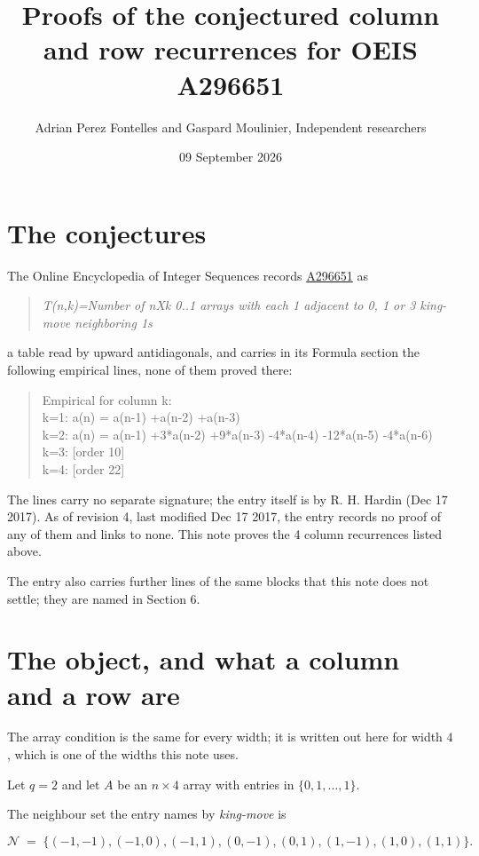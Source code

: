 \documentclass[11pt]{article}
\title{Proofs of the conjectured column and row recurrences for OEIS A296651}
\author{Adrian Perez Fontelles and Gaspard Moulinier, Independent researchers}
\date{09 September 2026}
\theoremstyle{definition}
\begin{document}
\maketitle
\section{The conjectures}

The Online Encyclopedia of Integer Sequences records \href{https://oeis.org/A296651}{A296651} as

\begin{quote}\itshape T(n,k)=Number of nXk 0..1 arrays with each 1 adjacent to 0, 1 or 3 king-move neighboring 1s\end{quote}

a table read by upward antidiagonals, and carries in its Formula section the following empirical lines, none of them proved there:

\begin{quote}\ttfamily Empirical for column k:\\
k=1: a(n) = a(n-1) +a(n-2) +a(n-3)\\k=2: a(n) = a(n-1) +3*a(n-2) +9*a(n-3) -4*a(n-4) -12*a(n-5) -4*a(n-6)\\k=3: [order 10]\\k=4: [order 22]\end{quote}

The lines carry no separate signature; the entry itself is by R. H. Hardin (Dec 17 2017). As of revision 4, last modified Dec 17 2017, the entry records no proof of any of them and links to none. This note proves the 4 column recurrences listed above.

The entry also carries further lines of the same blocks that this note does not settle; they are named in Section 6.

\section{The object, and what a column and a row are}

The array condition is the same for every width; it is written out here for width $4$, which is one of the widths this note uses.

Let $q = 2$ and let $A$ be an $n \times 4$ array with entries in $\{0,1,\dots,1\}$.

The neighbour set the entry names by {\itshape king-move} is

\[\mathcal{N} \;=\; \{(-1,-1), (-1,0), (-1,1), (0,-1), (0,1), (1,-1), (1,0), (1,1)\}.\]
\end{document}
